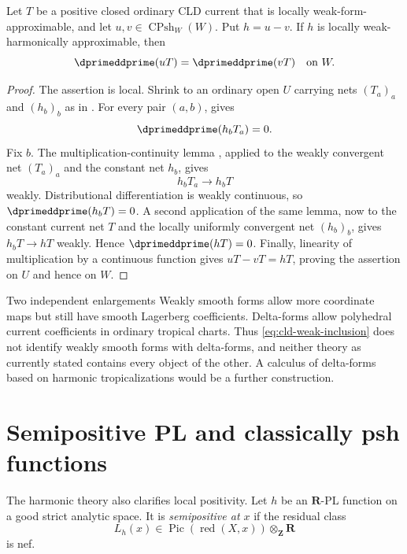 \begin{proposition}
\label{prop:ch18-weak-form-closure-bt}
Let $T$ be a positive closed ordinary CLD current that is locally
weak-form-approximable, and let $u,v\in\operatorname{CPsh}_W(W)$.  Put
$h=u-v$.  If $h$ is locally weak-harmonically approximable, then
\[
                 \dprimeddprime(uT)=\dprimeddprime(vT)
                 \quad\text{on }W.
\]
\end{proposition}

\begin{proof}
The assertion is local.  Shrink to an ordinary open $U$ carrying nets
$(T_a)_a$ and $(h_b)_b$ as in
.  For every pair $(a,b)$,
 gives
\[
                       \dprimeddprime(h_bT_a)=0.
\]
Fix $b$.  The multiplication-continuity lemma
, applied to the weakly
convergent net $(T_a)_a$ and the constant net $h_b$, gives
\[
                           h_bT_a\longrightarrow h_bT
\]
weakly.  Distributional differentiation is weakly continuous, so
$\dprimeddprime(h_bT)=0$.  A second application of the same lemma, now to
the constant current net $T$ and the locally uniformly convergent net
$(h_b)_b$, gives $h_bT\to hT$ weakly.  Hence
$\dprimeddprime(hT)=0$.  Finally, linearity of multiplication by a
continuous function gives $uT-vT=hT$, proving the assertion on $U$ and hence
on $W$.
\end{proof}

\begin{warning}{Two independent enlargements}
Weakly smooth forms allow more coordinate maps but still have smooth
Lagerberg coefficients.  Delta-forms allow polyhedral current coefficients
in ordinary tropical charts.  Thus
\eqref{eq:cld-weak-inclusion} does not identify weakly smooth forms with
delta-forms, and neither theory as currently stated contains every object of
the other.  A calculus of delta-forms based on harmonic tropicalizations
would be a further construction.
\end{warning}

\section{Semipositive PL and classically psh functions}
\label{sec:ch18-classical}

The harmonic theory also clarifies local positivity.  Let $h$ be an
$\mathbf R$-PL function on a good strict analytic space.  It is
\emph{semipositive at $x$} if the residual class
\[
                    L_h(x)\in\operatorname{Pic}(\operatorname{red}(X,x))
                                  \otimes_{\mathbf Z}\mathbf R
\]
is nef.

